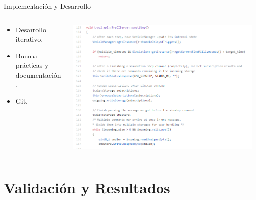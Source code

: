 \documentclass[aspectratio=169]{beamer}
\begin{document}
\begin{frame}{Implementación y Desarrollo}
\begin{columns}
    \begin{column}{.4\linewidth}
        \begin{itemize}
            \item Desarrollo iterativo.
            \item Buenas prácticas y documentación.
            \item Git.
        \end{itemize}
    \end{column}  
    \begin{column}{.6\linewidth}
        \includegraphics[width=\linewidth]{figuras/poststep_code.png}
    \end{column}    
\end{columns}
\end{frame}

\section{Validación y Resultados}
\end{document}
